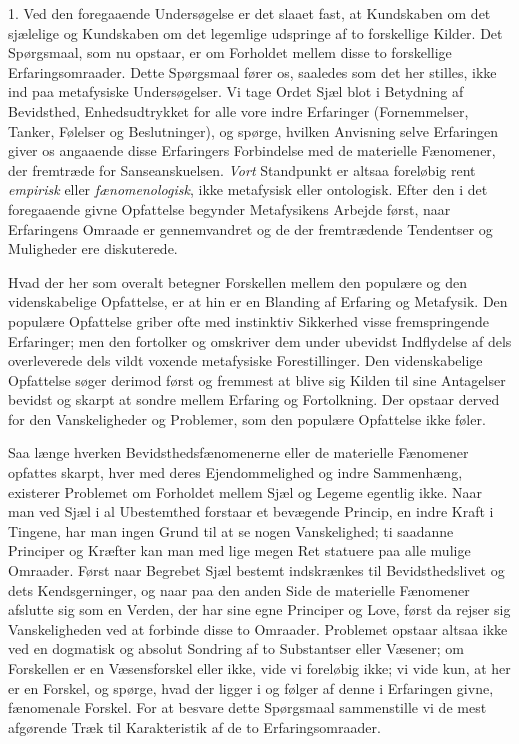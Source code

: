 \documentclass[12pt,a4paper,openany]{book}
\newcommand{\opage}[1]{\marginnote{\footnotesize\textit{[#1]}}}
\begin{document}
1. Ved den foregaaende Undersøgelse er det slaaet fast, at Kundskaben om
det sjælelige og Kundskaben om det legemlige udspringe af to forskellige
Kilder. Det Spørgsmaal, som nu opstaar, er om Forholdet mellem disse to
forskellige Erfaringsomraader. Dette Spørgsmaal fører os, saaledes som
det her stilles, ikke ind paa metafysiske Undersøgelser. Vi tage Ordet
Sjæl blot i Betydning af Bevidsthed, Enhedsudtrykket for alle vore indre
Erfaringer (Fornemmelser, Tanker, Følelser og Beslutninger), og spørge,
hvilken Anvisning selve Erfaringen giver os angaaende disse Erfaringers
Forbindelse med de materielle Fænomener, der fremtræde for
Sanseanskuelsen. \emph{Vort} Standpunkt er altsaa foreløbig rent
\emph{empirisk} eller \emph{fænomenologisk}, ikke metafysisk eller
ontologisk. Efter den i det foregaaende givne Opfattelse begynder
Metafysikens Arbejde først, naar Erfaringens Omraade er gennemvandret og
de der fremtrædende Tendentser og Muligheder ere diskuterede.

Hvad der her som overalt betegner Forskellen mellem den populære og den
videnskabelige Opfattelse, er at hin er en Blanding af Erfaring og
Metafysik. Den populære Opfattelse griber ofte med instinktiv Sikkerhed
visse fremspringende Erfaringer; men den fortolker og omskriver dem
under ubevidst Indflydelse af dels overleverede dels vildt voxende
metafysiske Forestillinger. Den videnskabelige Opfattelse søger derimod
først og fremmest at blive sig Kilden til sine Antagelser bevidst og
skarpt at sondre mellem Erfaring og Fortolkning. Der opstaar derved for
den Vanskeligheder og Problemer, som den populære Opfattelse ikke føler.


\opage{37}Saa længe hverken Bevidsthedsfænomenerne eller de materielle
Fænomener opfattes skarpt, hver med deres Ejendommelighed og indre
Sammenhæng, existerer Problemet om Forholdet mellem Sjæl og Legeme
egentlig ikke. Naar man ved Sjæl i al Ubestemthed forstaar et bevægende
Princip, en indre Kraft i Tingene, har man ingen Grund til at se nogen
Vanskelighed; ti saadanne Principer og Kræfter kan man med lige megen
Ret statuere paa alle mulige Omraader. Først naar Begrebet Sjæl bestemt
indskrænkes til Bevidsthedslivet og dets Kendsgerninger, og naar paa den
anden Side de materielle Fænomener afslutte sig som en Verden, der har
sine egne Principer og Love, først da rejser sig Vanskeligheden ved at
forbinde disse to Omraader. Problemet opstaar altsaa ikke ved en
dogmatisk og absolut Sondring af to Substantser eller Væsener; om
Forskellen er en Væsensforskel eller ikke, vide vi foreløbig ikke; vi
vide kun, at her er en Forskel, og spørge, hvad der ligger i og følger
af denne i Erfaringen givne, fænomenale Forskel. For at besvare dette
Spørgsmaal sammenstille vi de mest afgørende Træk til Karakteristik af
de to Erfaringsomraader.
\end{document}
